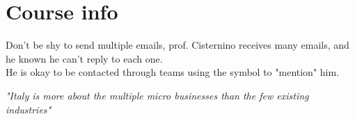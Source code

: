 \chapter*{Course info}

Don't be shy to send multiple emails, prof. Cisternino receives many emails, and he known he can't reply to each one.\\
He is okay to be contacted through teams using the \textbf{\@} symbol to "mention" him.

\begin{center}
   \textit{"Italy is more about the multiple micro businesses than the few existing industries"}
\end{center}

